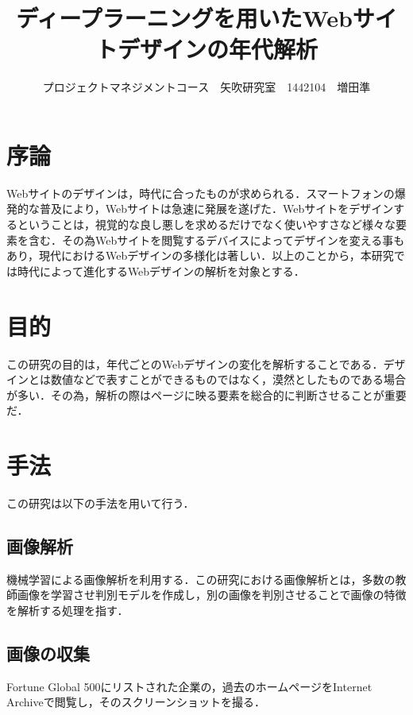 \documentclass[uplatex,twocolumn,dvipdfmx]{jsarticle}
\title{\vspace{-5mm}\fontsize{14pt}{0pt}\selectfont ディープラーニングを用いたWebサイトデザインの年代解析}
\author{\normalsize プロジェクトマネジメントコース　矢吹研究室　1442104　増田準}
\date{}
\begin{document}
\fontsize{10.5pt}{\baselineskip}\selectfont
\maketitle





\section{序論}\label{序論}

Webサイトのデザインは，時代に合ったものが求められる\cite{bib001}．スマートフォンの爆発的な普及により，Webサイトは急速に発展を遂げた．Webサイトをデザインするということは，視覚的な良し悪しを求めるだけでなく使いやすさなど様々な要素を含む．その為Webサイトを閲覧するデバイスによってデザインを変える事もあり，現代におけるWebデザインの多様化は著しい．以上のことから，本研究では時代によって進化するWebデザインの解析を対象とする．

\section{目的}

この研究の目的は，年代ごとのWebデザインの変化を解析することである．デザインとは数値などで表すことができるものではなく，漠然としたものである場合が多い．その為，解析の際はページに映る要素を総合的に判断させることが重要だ．

\section{手法}

この研究は以下の手法を用いて行う． 

\subsection{画像解析}

機械学習による画像解析を利用する．この研究における画像解析とは，多数の教師画像を学習させ判別モデルを作成し，別の画像を判別させることで画像の特徴を解析する処理を指す．

\subsection{画像の収集}

Fortune Global 500\cite{bib002}にリストされた企業の，過去のホームページをInternet Archiveで閲覧し，そのスクリーンショットを撮る． 
\end{document}
